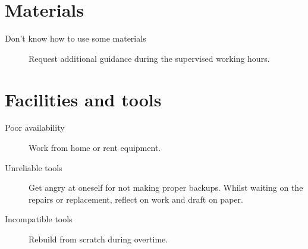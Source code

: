 \section{Materials}
\begin{description}
\item[Don't know how to use some materials] Request additional guidance during the supervised working hours. \\
\end{description}

\section{Facilities and tools}
\begin{description}
\item[Poor availability] Work from home or rent equipment. \\
\item[Unreliable tools] Get angry at oneself for not making proper backups. Whilst waiting on the repairs or replacement, reflect on work and draft on paper. \\
\item[Incompatible tools] Rebuild from scratch during overtime. \\
\end{description}

